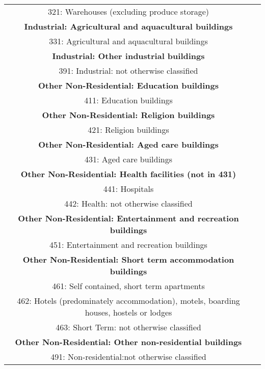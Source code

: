 \begin{table}
{\begin{tabular}{|c|p{}|}
 321:  Warehouses (excluding produce storage) \\
 \textbf{Industrial: Agricultural and aquacultural buildings} \\
 331:  Agricultural and aquacultural buildings \\
 \textbf{Industrial: Other industrial buildings} \\
 391:  Industrial: not otherwise classified\\
\hline
 \textbf{Other Non-Residential: Education buildings} \\
 411:  Education buildings \\
 \textbf{Other Non-Residential: Religion buildings} \\
 421:  Religion buildings \\
 \textbf{Other Non-Residential: Aged care buildings} \\
 431:  Aged care buildings \\
 \textbf{Other Non-Residential: Health facilities (not in 431)} \\
 441:  Hospitals \\
 442:  Health: not otherwise classified\\
 \textbf{Other Non-Residential: Entertainment and recreation buildings} \\
 451:  Entertainment and recreation buildings \\
 \textbf{Other Non-Residential: Short term accommodation buildings} \\
 461:  Self contained, short term apartments\\
 462:  Hotels (predominately accommodation), motels, boarding houses, hostels or lodges\\
 463:  Short Term: not otherwise classified\\
 \textbf{Other Non-Residential: Other non-residential buildings} \\
 491:  Non-residential:not otherwise classified\\
\hline
\end{tabular}
}
\end{table}


